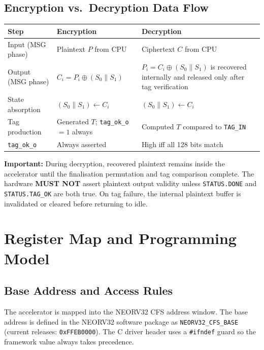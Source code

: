 \documentclass[11pt,a4paper]{article}
\newcommand{\warn}[1]{%
  \begin{tcolorbox}[
    enhanced, colback=warnbg, colframe=warnframe,
    arc=2pt, boxrule=0.5pt, left=6pt, right=6pt, top=3pt, bottom=3pt,
    before upper={\small}
  ]
  \textbf{\color{warnframe}Important:} #1
  \end{tcolorbox}\vspace{3pt}}
\newcommand{\thead}[1]{\cellcolor{tabhead}\color{white}\textbf{\small #1}}
\begin{document}
\subsection{Encryption vs.\ Decryption Data Flow}

\begin{center}
\begin{tabular}{@{}lL{5.5cm}L{5.5cm}@{}}
  \toprule
  \thead{Step} & \thead{Encryption} & \thead{Decryption} \\
  \midrule
  Input (MSG phase)   & Plaintext $P$ from CPU & Ciphertext $C$ from CPU \\
  Output (MSG phase)  & $C_i = P_i \oplus (S_0 \| S_1)$ & $P_i = C_i \oplus (S_0 \| S_1)$ is recovered internally and released only after tag verification \\
  State absorption    & $(S_0 \| S_1) \leftarrow C_i$ & $(S_0 \| S_1) \leftarrow C_i$ \\
  Tag production      & Generated $T$; \texttt{tag\_ok\_o}~$= 1$ always & Computed $T$ compared to \texttt{TAG\_IN} \\
  \texttt{tag\_ok\_o} & Always asserted & High iff all 128 bits match \\
  \bottomrule
\end{tabular}
\end{center}

\warn{During decryption, recovered plaintext remains inside the accelerator until
the finalisation permutation and tag comparison complete. The hardware
\textbf{MUST NOT} assert plaintext output validity unless \texttt{STATUS.DONE}
and \texttt{STATUS.TAG\_OK} are both true. On tag failure, the internal
plaintext buffer is invalidated or cleared before returning to idle.}

\section{Register Map and Programming Model}
\label{sec:regmap}

\subsection{Base Address and Access Rules}

The accelerator is mapped into the NEORV32 CFS address window.
The base address is defined in the NEORV32 software package as
\texttt{NEORV32\_CFS\_BASE} (current releases: \texttt{0xFFEB0000}).
The C driver header uses a \texttt{\#ifndef} guard so the framework value
always takes precedence.
\end{document}
